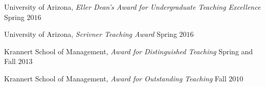 \documentclass[10pt,letterpaper]{article}
\renewenvironment{itemize}{
  \begin{list}{}{
    \setlength{\leftmargin}{1.5em}
    \setlength{\itemsep}{0.25em}
    \setlength{\parskip}{0pt}
    \setlength{\parsep}{0.25em}
  }
}{
  \end{list}
}
\begin{document}
\begin{itemize}
\item University of Arizona, \emph{Eller Dean's Award for Undergraduate Teaching Excellence} \hfill Spring $2016$
\item University of Arizona, \emph{Scrivner Teaching Award} \hfill Spring $2016$
\item Krannert School of Management, \emph{Award for Distinguished Teaching} \hfill Spring and Fall $2013$
\item Krannert School of Management, \emph{Award for Outstanding Teaching} \hfill Fall $2010$
\end{itemize}
\end{document}

